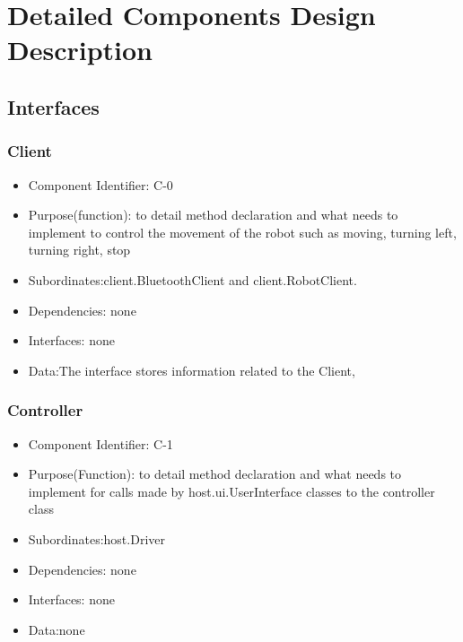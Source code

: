 \documentclass[11pt, a4paper]{report}
\begin{document}
\section{Detailed Components Design Description}
\subsection{Interfaces}
\subsubsection{Client}
\begin{itemize}
\item Component Identifier: C-0
\item Purpose(function): to detail method declaration and what needs to implement 
to control the movement of the robot such as moving, turning left, turning right, stop
\item Subordinates:client.BluetoothClient and client.RobotClient.
\item Dependencies: none
\item Interfaces: none
\item Data:The interface stores information related to the Client, %
\end{itemize}

\subsubsection{Controller}
\begin{itemize}
\item Component Identifier: C-1
\item Purpose(Function): to detail method declaration and what needs to implement
for calls made by host.ui.UserInterface classes to the controller class
\item Subordinates:host.Driver
\item Dependencies: none
\item Interfaces: none
\item Data:none
\end{itemize}
\end{document}
